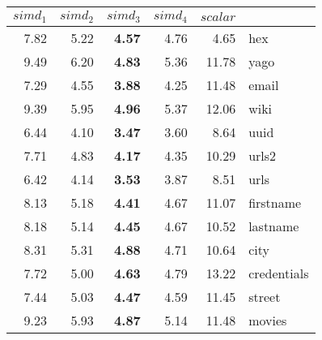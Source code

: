 {\begin{tabular}{|rrrr|r|l|}
\hline
{\footnotesize{$simd_1$}}&{\footnotesize{$simd_2$}}&{\footnotesize{\bf $simd_3$}}&{\footnotesize{$simd_4$}}&{\footnotesize{$scalar$}}&\\
\hline
\hline
{\footnotesize{ 7.82}}& {\footnotesize{ 5.22}}& {\footnotesize{\bf  4.57}}& {\footnotesize{ 4.76}}& {\footnotesize{ 4.65}}& {\footnotesize hex}\\
{\footnotesize{ 9.49}}& {\footnotesize{ 6.20}}& {\footnotesize{\bf  4.83}}& {\footnotesize{ 5.36}}& {\footnotesize{11.78}}& {\footnotesize yago}\\
{\footnotesize{ 7.29}}& {\footnotesize{ 4.55}}& {\footnotesize{\bf  3.88}}& {\footnotesize{ 4.25}}& {\footnotesize{11.48}}& {\footnotesize email}\\
{\footnotesize{ 9.39}}& {\footnotesize{ 5.95}}& {\footnotesize{\bf  4.96}}& {\footnotesize{ 5.37}}& {\footnotesize{12.06}}& {\footnotesize wiki}\\
{\footnotesize{ 6.44}}& {\footnotesize{ 4.10}}& {\footnotesize{\bf  3.47}}& {\footnotesize{ 3.60}}& {\footnotesize{ 8.64}}& {\footnotesize uuid}\\
{\footnotesize{ 7.71}}& {\footnotesize{ 4.83}}& {\footnotesize{\bf  4.17}}& {\footnotesize{ 4.35}}& {\footnotesize{10.29}}& {\footnotesize urls2}\\
{\footnotesize{ 6.42}}& {\footnotesize{ 4.14}}& {\footnotesize{\bf  3.53}}& {\footnotesize{ 3.87}}& {\footnotesize{ 8.51}}& {\footnotesize urls}\\
{\footnotesize{ 8.13}}& {\footnotesize{ 5.18}}& {\footnotesize{\bf  4.41}}& {\footnotesize{ 4.67}}& {\footnotesize{11.07}}& {\footnotesize firstname}\\
{\footnotesize{ 8.18}}& {\footnotesize{ 5.14}}& {\footnotesize{\bf  4.45}}& {\footnotesize{ 4.67}}& {\footnotesize{10.52}}& {\footnotesize lastname}\\
{\footnotesize{ 8.31}}& {\footnotesize{ 5.31}}& {\footnotesize{\bf  4.88}}& {\footnotesize{ 4.71}}& {\footnotesize{10.64}}& {\footnotesize city}\\
{\footnotesize{ 7.72}}& {\footnotesize{ 5.00}}& {\footnotesize{\bf  4.63}}& {\footnotesize{ 4.79}}& {\footnotesize{13.22}}& {\footnotesize credentials}\\
{\footnotesize{ 7.44}}& {\footnotesize{ 5.03}}& {\footnotesize{\bf  4.47}}& {\footnotesize{ 4.59}}& {\footnotesize{11.45}}& {\footnotesize street}\\
{\footnotesize{ 9.23}}& {\footnotesize{ 5.93}}& {\footnotesize{\bf  4.87}}& {\footnotesize{ 5.14}}& {\footnotesize{11.48}}& {\footnotesize movies}\\

\end{tabular}}
